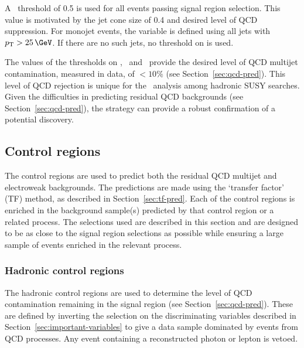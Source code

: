 A \bdphi~threshold of 0.5 is used for all events passing signal region selection.
This value is motivated by the jet cone size of 0.4 and desired level of 
QCD suppression. For monojet events, the \bdphi variable is defined using all jets with 
$\pt > 25\,\GeV$. If there are no such jets, no threshold on \bdphi is used.

The values of the thresholds on \alphat, \bdphi~and \mhtmet~provide the desired 
level of QCD multijet contamination, measured in data, of $< 10\%$
(see Section~\ref{sec:qcd-pred}). This level of QCD rejection is unique for the 
\alphat~analysis among hadronic SUSY searches. Given the difficulties in predicting
residual QCD backgrounds (see Section~\ref{sec:qcd-pred}), the \alphat strategy can provide a robust 
confirmation of a potential discovery.
%
%

\subsection{Control regions}
\label{sec:cr-sel}
The control regions are used to predict both the residual QCD multijet
and electroweak backgrounds. The predictions are made using the 
`transfer factor' (TF) method, as described in Section~\ref{sec:tf-pred}.
Each of the control regions is enriched 
in the background sample(s) predicted by that control region or a related 
process. The selections used are described in this section and are designed to 
be as close to the signal region selections as possible 
while ensuring a large sample of events enriched in the relevant process. 

\subsubsection{Hadronic control regions}
The hadronic control regions are used to determine the level of QCD contamination
remaining in the signal region (see Section~\ref{sec:qcd-pred}). These are defined by inverting the selection on the 
discriminating variables described in Section~\ref{sec:important-variables} to give a data sample 
dominated by events from QCD processes. Any event containing a reconstructed photon or lepton is vetoed.

